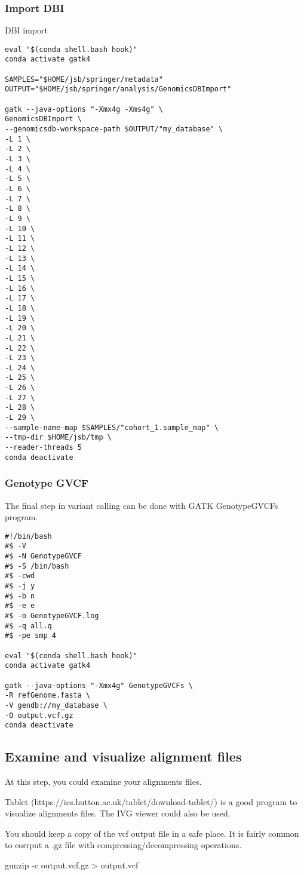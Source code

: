 \subsubsection{Import DBI }

DBI import

\begin{verbatim}
eval "$(conda shell.bash hook)"
conda activate gatk4

SAMPLES="$HOME/jsb/springer/metadata"
OUTPUT="$HOME/jsb/springer/analysis/GenomicsDBImport"

gatk --java-options "-Xmx4g -Xms4g" \
GenomicsDBImport \
--genomicsdb-workspace-path $OUTPUT/"my_database" \
-L 1 \
-L 2 \
-L 3 \
-L 4 \
-L 5 \
-L 6 \
-L 7 \
-L 8 \
-L 9 \
-L 10 \
-L 11 \
-L 12 \
-L 13 \
-L 14 \
-L 15 \
-L 16 \
-L 17 \
-L 18 \
-L 19 \
-L 20 \
-L 21 \
-L 22 \
-L 23 \
-L 24 \
-L 25 \
-L 26 \
-L 27 \
-L 28 \
-L 29 \
--sample-name-map $SAMPLES/"cohort_1.sample_map" \
--tmp-dir $HOME/jsb/tmp \
--reader-threads 5
conda deactivate

\end{verbatim}










\subsubsection{Genotype GVCF}

The final step in variant calling can be done with GATK GenotypeGVCFs program.

\begin{verbatim}
#!/bin/bash
#$ -V
#$ -N GenotypeGVCF
#$ -S /bin/bash
#$ -cwd
#$ -j y
#$ -b n
#$ -e e
#$ -o GenotypeGVCF.log
#$ -q all.q
#$ -pe smp 4

eval "$(conda shell.bash hook)"
conda activate gatk4

gatk --java-options "-Xmx4g" GenotypeGVCFs \
-R refGenome.fasta \
-V gendb://my_database \
-O output.vcf.gz
conda deactivate
\end{verbatim}






\subsection{Examine and visualize alignment files}

At this step, you could examine your alignments files.

Tablet (https://ics.hutton.ac.uk/tablet/download-tablet/) is a good program to visualize alignments files. The IVG viewer could also be used.


You should keep a copy of the vcf output file in a safe place. It is fairly common to corrput a .gz file with compressing/decompressing operations.





gunzip -c output.vcf.gz > output.vcf
